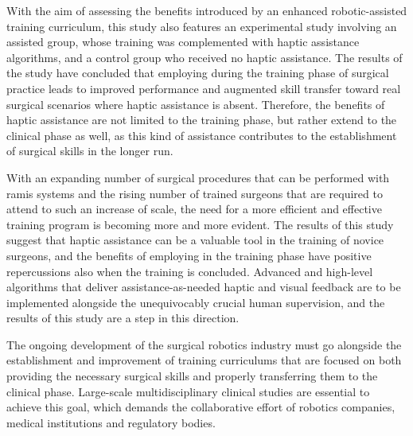 \documentclass[../main.tex]{subfiles}
\begin{document}
With the aim of assessing the benefits introduced by an enhanced robotic-assisted training curriculum, this study also features an experimental study involving an assisted group, whose training was complemented with haptic assistance algorithms, and a control group who received no haptic assistance. 
The results of the study have concluded that employing \vfs during the training phase of surgical practice leads to improved performance and augmented skill transfer toward real surgical scenarios where haptic assistance is absent. Therefore, the benefits of haptic assistance are not limited to the training phase, but rather extend to the clinical phase as well, as this kind of assistance contributes to the establishment of surgical skills in the longer run.  

With an expanding number of surgical procedures that can be performed with \ac{ramis} systems and the rising number of trained surgeons that are required to attend to such an increase of scale, the need for a more efficient and effective training program is becoming more and more evident. The results of this study suggest that haptic assistance can be a valuable tool in the training of novice surgeons, and the benefits of employing \vfs in the training phase have positive repercussions also when the training is concluded. Advanced and high-level algorithms that deliver assistance-as-needed haptic and visual feedback are to be implemented alongside the unequivocably crucial human supervision, and the results of this study are a step in this direction. 

The ongoing development of the surgical robotics industry must go alongside the establishment and improvement of training curriculums that are focused on both providing the necessary surgical skills and properly transferring them to the clinical phase. Large-scale multidisciplinary clinical studies are essential to achieve this goal, which demands the collaborative effort of robotics companies, medical institutions and regulatory bodies. 


% 
% 
\end{document}
